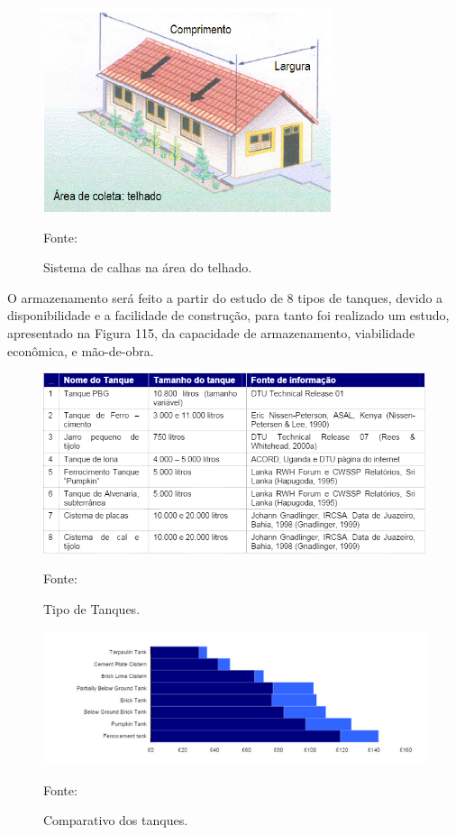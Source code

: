 \begin{figure}[H]
	 \centering
	\label{Sistema de calhas na área do telhado.}
	 \includegraphics[scale=0.6]{captacao/6.png}
	 \caption{Sistema de calhas na área do telhado.}
	 \small{Fonte: \cite{WATERFALL}}
\end{figure}

O armazenamento será feito a partir do estudo de 8 tipos de tanques, devido a disponibilidade e a facilidade de construção, para tanto foi realizado um estudo, apresentado na Figura 115, da capacidade de armazenamento, viabilidade econômica, e mão-de-obra.

\begin{figure}[H]
	 \centering
	\label{Tipo de Tanques}
	 \includegraphics[scale=0.6]{captacao/7.png}
	 \caption{Tipo de Tanques.}
	 \small{Fonte: \cite{gnadlinger1999technical}}
\end{figure}

\begin{figure}[H]
	 \centering
	\label{Comparativo dos tanques}
	 \includegraphics[scale=0.6]{captacao/8.png}
	 \caption{Comparativo dos tanques.}
	\small{Fonte: \cite{gnadlinger1999technical}}
\end{figure}

